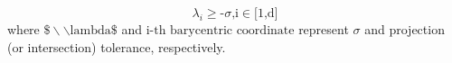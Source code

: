 \begin{equation} \label{eq:projtol}
	\lambda _i\text{$\geq $-$\sigma $,i$\in $[1,d]}
\end{equation}
where $\text{$\$\backslash \backslash $lambda$\$$}$ and $\text{i-th barycentric coordinate}$ represent $\sigma$ and projection (or intersection) tolerance, respectively.